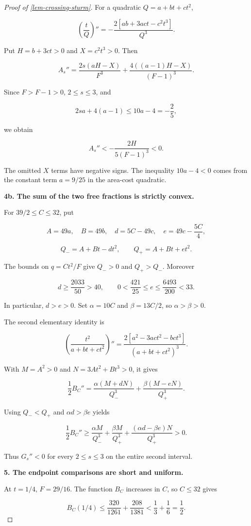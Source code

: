 \documentclass[11pt,a4paper]{article}
\theoremstyle{proofmanuscript}
\begin{document}
\begin{proof}[Proof of \ref{lem-crossing-sturm}]
For a quadratic \(Q=a+bt+ct^2\),

\[
\left(\frac tQ\right)''
=-\frac{2[ab+3ac t-c^2t^3]}{Q^3}.
\]

Put \(H=b+3ct>0\) and \(X=c^2t^3>0\). Then

\[
A_s''=
\frac{2s(aH-X)}{F^3}
+\frac{4((a-1)H-X)}{(F-1)^3}.
\]

Since \(F>F-1>0\), \(2\le s\le3\), and

\[
2sa+4(a-1)\le10a-4=-\frac25,
\]

we obtain

\[
A_s''<-
\frac{2H}{5(F-1)^3}<0.
\tag{H.5.13}
\]

The omitted \(X\) terms have negative signs. The inequality \(10a-4<0\) comes from the constant term \(a=9/25\) in the area-cost quadratic.

\textbf{4b. The sum of the two free fractions is strictly convex.}

For \(39/2\le C\le32\), put

\[
A=49a,\quad B=49b,\quad
d=5C-49c,\quad e=49c-\frac{5C}{4},
\]

\[
Q_-=A+Bt-dt^2,\qquad Q_+=A+Bt+et^2.
\]

The bounds on \(q=Ct^2/F\) give \(Q_->0\) and \(Q_+>Q_-\). Moreover

\[
d\ge\frac{2033}{50}>40,\qquad
0<\frac{421}{25}\le e\le\frac{6493}{200}<33.
\]

In particular, \(d>e>0\). Set \(\alpha=10C\) and \(\beta=13C/2\), so \(\alpha>\beta>0\).

The second elementary identity is

\[
\left(\frac{t^2}{a+bt+ct^2}\right)''
=\frac{2[a^2-3ac t^2-bc t^3]}{(a+bt+ct^2)^3}.
\]

With \(M=A^2>0\) and \(N=3At^2+Bt^3>0\), it gives

\[
\frac12 B_C''
=\frac{\alpha(M+dN)}{Q_-^3}
+\frac{\beta(M-eN)}{Q_+^3}.
\]

Using \(Q_-<Q_+\) and \(\alpha d>\beta e\) yields

\[
\frac12 B_C''
\ge\frac{\alpha M}{Q_-^3}+\frac{\beta M}{Q_+^3}
+\frac{(\alpha d-\beta e)N}{Q_+^3}>0.
\tag{H.5.14}
\]

Thus \(G_s''<0\) for every \(2\le s\le3\) on the entire second interval.

\textbf{5. The endpoint comparisons are short and uniform.}

At \(t=1/4\), \(F=29/16\). The function \(B_C\) increases in \(C\), so \(C\le32\) gives

\[
B_C(1/4)\le\frac{320}{1261}+\frac{208}{1381}
<\frac13+\frac16=\frac12.
\]


\end{proof}
\end{document}
